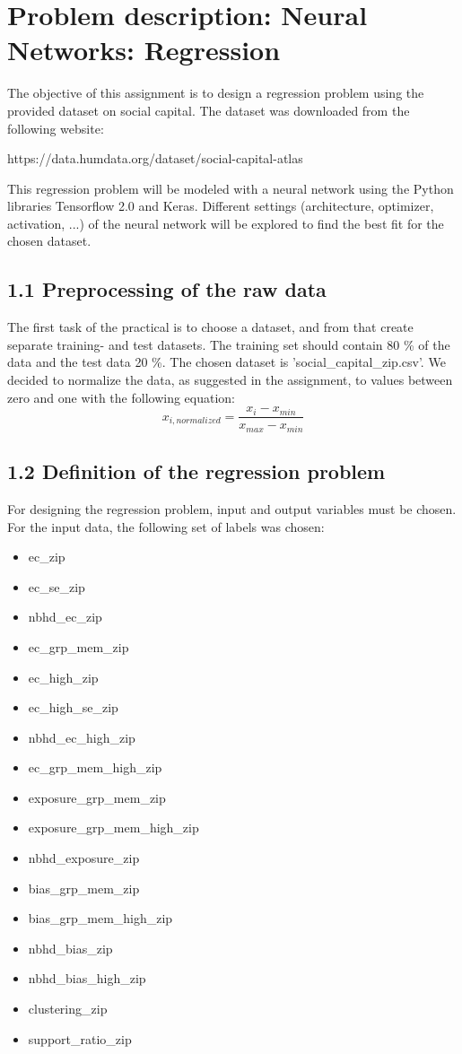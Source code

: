 
\section{Problem description: Neural Networks: Regression}
The objective of this assignment is to design a regression problem using the provided dataset on social capital. The dataset was downloaded from the following website:

https://data.humdata.org/dataset/social-capital-atlas

This regression problem will be modeled with a neural network using the Python libraries Tensorflow 2.0 and Keras. Different settings (architecture, optimizer, activation, ...) of the neural network will be explored to find the best fit for the chosen dataset.

\subsection*{1.1 Preprocessing of the raw data}

The first task of the practical is to choose a dataset, and from that create separate training- and test datasets. The training set should contain 80 \% of the data and the test data 20 \%. The chosen dataset is ’social\_capital\_zip.csv’. We decided to normalize the data, as suggested in the assignment, to values between zero and one with the following equation:
\[x_{i,normalized} = \frac{x_{i}-x_{min}}{x_{max}-x_{min}}\]

\subsection*{1.2 Definition of the regression problem}
For designing the regression problem, input and output variables must be chosen. For the input data, the following set of labels was chosen: 
\begin{itemize}
\item ec\_zip
\item ec\_se\_zip
\item nbhd\_ec\_zip
\item ec\_grp\_mem\_zip
\item ec\_high\_zip
\item ec\_high\_se\_zip
\item nbhd\_ec\_high\_zip
\item ec\_grp\_mem\_high\_zip
\item exposure\_grp\_mem\_zip
\item exposure\_grp\_mem\_high\_zip
\item nbhd\_exposure\_zip
\item bias\_grp\_mem\_zip
\item bias\_grp\_mem\_high\_zip
\item nbhd\_bias\_zip
\item nbhd\_bias\_high\_zip
\item clustering\_zip
\item support\_ratio\_zip
\end{itemize}

